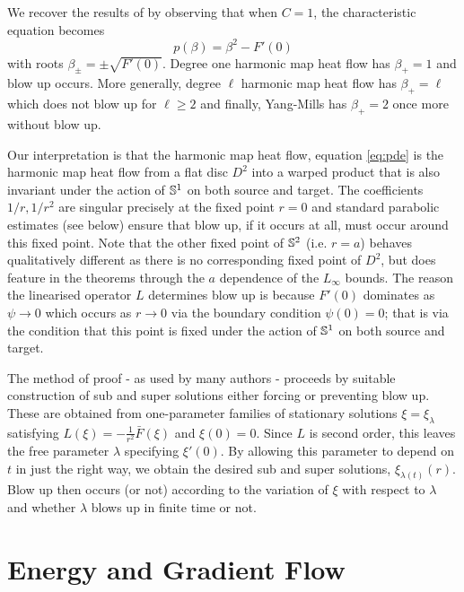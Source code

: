 \documentclass{amsart}
\begin{document}
\begin{rem}
\label{rem:char_eqn_C1}
We recover the results of \cite{MR2332425} by observing that when \(C = 1\), the characteristic equation becomes
\[
p(\beta) = \beta^2 - F'(0)
\]
with roots \(\beta_{\pm} = \pm \sqrt{F'(0)}\). Degree one harmonic map heat flow has \(\beta_+ = 1\) and blow up occurs. More generally, degree \(\ell\) harmonic map heat flow has \(\beta_+ = \ell\) which does not blow up for \(\ell \geq 2\) and finally, Yang-Mills has \(\beta_+ = 2\) once more without blow up.
\end{rem}

Our interpretation is that the harmonic map heat flow, equation \eqref{eq:pde} is the harmonic map heat flow from a flat disc \(D^2\) into a warped product that is also invariant under the action of \(\S^1\) on both source and target. The coefficients \(1/r, 1/r^2\) are singular precisely at the fixed point \(r = 0\) and standard parabolic estimates (see  below) ensure that blow up, if it occurs at all, must occur around this fixed point. Note that the other fixed point of \(\S^2\) (i.e. \(r=a\)) behaves qualitatively different as there is no corresponding fixed point of \(D^2\), but does feature in the theorems through the \(a\) dependence of the \(L_{\infty}\) bounds. The reason the linearised operator \(L\) determines blow up is because \(F'(0)\) dominates as \(\psi \to 0\) which occurs as \(r \to 0\) via the boundary condition \(\psi(0) = 0\); that is via the condition that this point is fixed under the action of \(\S^1\) on both source and target.


The method of proof - as used by many authors \cite{MR2332425,MR1180392} - proceeds by suitable construction of sub and super solutions either forcing or preventing blow up. These are obtained from one-parameter families of stationary solutions \(\xi = \xi_{\lambda}\) satisfying \(L(\xi) = -\tfrac{1}{r^2} \bar{F} (\xi)\) and \(\xi(0) = 0\). Since \(L\) is second order, this leaves the free parameter \(\lambda\) specifying \(\xi'(0)\). By allowing this parameter to depend on \(t\) in just the right way, we obtain the desired sub and super solutions, \(\xi_{\lambda(t)} (r)\). Blow up then occurs (or not) according to the variation of \(\xi\) with respect to \(\lambda\) and whether \(\lambda\) blows up in finite time or not.


\section{Energy and Gradient Flow}
\label{subsec:intro_energygradient}
\end{document}
